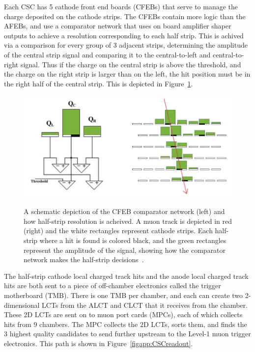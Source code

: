 Each CSC has 5 cathode front end boards (CFEBs) that serve to manage the charge deposited on the cathode strips.  The CFEBs contain more logic than the AFEBs, and use a comparator network that uses on board amplifier shaper outputs to achieve a resolution corresponding to each half strip.  This is achived via a comparison for every group of 3 adjacent strips, determining the amplitude of the central strip signal and comparing it to the central-to-left and central-to-right signal.  Thus if the charge on the central strip is above the threshold, and the charge on the right strip is larger than on the left, the hit position must be in the right half of the central strip.  This is depicted in Figure~\ref{figapp:CSCclct}.

\begin{figure}[!Hh]
       \centering
       \includegraphics[scale=0.5]{Figures/CSCclct.png} \\
       \caption[A schematic depiction of the formation of a cathode local charged track.]{A schematic depiction of the CFEB comparator network (left) and how half-strip resolution is acheived.  A muon track is depicted in red (right) and the white rectangles represent cathode strips.  Each half-strip where a hit is found is colored black, and the green rectangles represent the amplitude of the signal, showing how the comparator network makes the half-strip decisions~\cite{CMSdetector}.}
\label{figapp:CSCclct}
\end{figure}

The half-strip cathode local charged track hits and the anode local charged track hits are both sent to a piece of off-chamber electronics called the trigger motherboard (TMB).  There is one TMB per chamber, and each can create two 2-dimensional LCTs from the ALCT and CLCT that it receives from the chamber.  These 2D LCTs are sent on to muon port cards (MPCs), each of which collects hits from 9 chambers.  The MPC collects the 2D LCTs, sorts them, and finds the 3 highest quality candidates to send further upstream to the Level-1 muon trigger electronics.  This path is shown in Figure~\ref{figapp:CSCreadout}.

